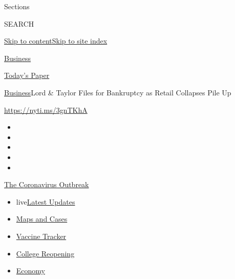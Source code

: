 Sections

SEARCH

\protect\hyperlink{site-content}{Skip to
content}\protect\hyperlink{site-index}{Skip to site index}

\href{https://www.nytimes3xbfgragh.onion/section/business}{Business}

\href{https://myaccount.nytimes3xbfgragh.onion/auth/login?response_type=cookie\&client_id=vi}{}

\href{https://www.nytimes3xbfgragh.onion/section/todayspaper}{Today's
Paper}

\href{/section/business}{Business}\textbar{}Lord \& Taylor Files for
Bankruptcy as Retail Collapses Pile Up

\url{https://nyti.ms/3gnTKhA}

\begin{itemize}
\item
\item
\item
\item
\item
\end{itemize}

\href{https://www.nytimes3xbfgragh.onion/news-event/coronavirus?action=click\&pgtype=Article\&state=default\&region=TOP_BANNER\&context=storylines_menu}{The
Coronavirus Outbreak}

\begin{itemize}
\tightlist
\item
  live\href{https://www.nytimes3xbfgragh.onion/2020/08/03/world/coronavirus-covid-19.html?action=click\&pgtype=Article\&state=default\&region=TOP_BANNER\&context=storylines_menu}{Latest
  Updates}
\item
  \href{https://www.nytimes3xbfgragh.onion/interactive/2020/us/coronavirus-us-cases.html?action=click\&pgtype=Article\&state=default\&region=TOP_BANNER\&context=storylines_menu}{Maps
  and Cases}
\item
  \href{https://www.nytimes3xbfgragh.onion/interactive/2020/science/coronavirus-vaccine-tracker.html?action=click\&pgtype=Article\&state=default\&region=TOP_BANNER\&context=storylines_menu}{Vaccine
  Tracker}
\item
  \href{https://www.nytimes3xbfgragh.onion/2020/08/02/us/covid-college-reopening.html?action=click\&pgtype=Article\&state=default\&region=TOP_BANNER\&context=storylines_menu}{College
  Reopening}
\item
  \href{https://www.nytimes3xbfgragh.onion/live/2020/08/03/business/stock-market-today-coronavirus?action=click\&pgtype=Article\&state=default\&region=TOP_BANNER\&context=storylines_menu}{Economy}
\end{itemize}

